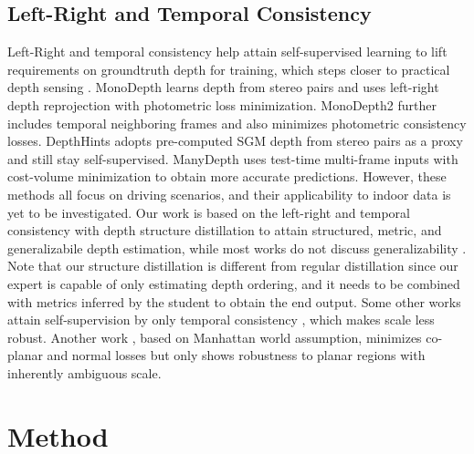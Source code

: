 \documentclass[10pt,twocolumn,letterpaper]{article}
\begin{document}
\subsection{Left-Right and Temporal Consistency}
\label{sec:self-supervised}
Left-Right and temporal consistency help attain self-supervised learning to lift requirements on groundtruth depth for training, which steps closer to practical depth sensing \cite{klingner2020self, guizilini20203d, kumar2020unrectdepthnet, Kumar_2021_WACV, poggi2020uncertainty}. MonoDepth \cite{godard2017unsupervised} learns depth from stereo pairs and uses left-right depth reprojection with photometric loss minimization. MonoDepth2 \cite{Godard_2019_ICCV} further includes temporal neighboring frames and also minimizes photometric consistency losses. DepthHints \cite{watson2019self} adopts pre-computed SGM \cite{hirschmuller2006stereo, hirschmuller2007stereo} depth from stereo pairs as a proxy and still stay self-supervised. ManyDepth \cite{watson2021temporal} uses test-time multi-frame inputs with cost-volume minimization to obtain more accurate predictions. However, these methods all focus on driving scenarios, and their applicability to indoor data is yet to be investigated. Our work is based on the left-right and temporal consistency with depth structure distillation to attain structured, metric, and generalizabile depth estimation, while most works do not discuss generalizability \cite{yang2020d3vo, gu2021dro, gordon2019depth, Godard_2019_ICCV,watson2021temporal}. Note that our structure distillation is different from regular distillation \cite{hinton2015distilling,zagoruyko2016paying, romero2014fitnets} since our expert is capable of only estimating depth ordering, and it needs to be combined with metrics inferred by the student to obtain the end output.
Some other works attain self-supervision by only temporal consistency \cite{bian2021unsupervised,  ji2021monoindoor}, which makes scale less robust. Another work \cite{li2021structdepth}, based on Manhattan world assumption, minimizes co-planar and normal losses but only shows robustness to planar regions with inherently ambiguous scale. 

\section{Method}
\label{sec:method}
\end{document}
